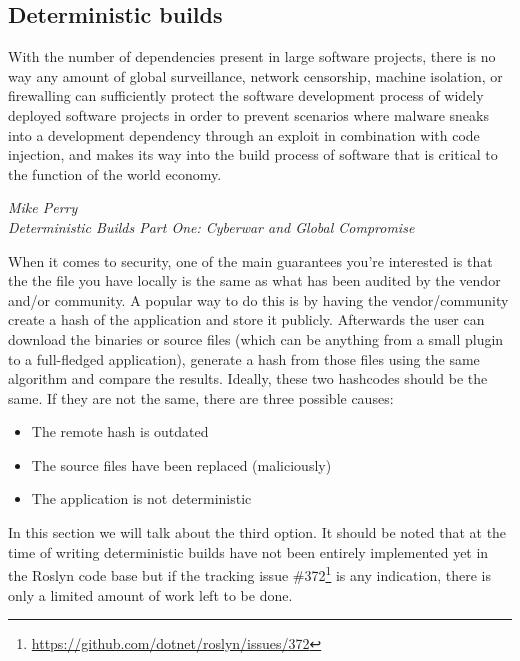 \subsection{Deterministic builds}
\label{sec:deterministic-builds}

\epigraph{With the number of dependencies present in large software projects, there is no way any amount of global surveillance, network censorship, machine isolation, or firewalling can sufficiently protect the software development process of widely deployed software projects in order to prevent scenarios where malware sneaks into a development dependency through an exploit in combination with code injection, and makes its way into the build process of software that is critical to the function of the world economy.}
{\textit{Mike Perry \\ \footnotesize{Deterministic Builds Part One: Cyberwar and Global Compromise\protect\footnotemark}}}


When it comes to security, one of the main guarantees you're interested is that the the file you have locally is the same as what has been audited by the vendor and/or community. A popular way to do this is by having the vendor/community create a hash of the application and store it publicly. Afterwards the user can download the binaries or source files (which can be anything from a small plugin to a full-fledged application), generate a hash from those files using the same algorithm and compare the results. Ideally, these two hashcodes should be the same. If they are not the same, there are three possible causes:

\begin{itemize}
\item The remote hash is outdated
\item The source files have been replaced (maliciously)
\item The application is not deterministic
\end{itemize}

In this section we will talk about the third option. It should be noted that at the time of writing deterministic builds have not been entirely implemented yet in the Roslyn code base but if the tracking issue \#372\footnote{\url{https://github.com/dotnet/roslyn/issues/372}} is any indication, there is only a limited amount of work left to be done.

